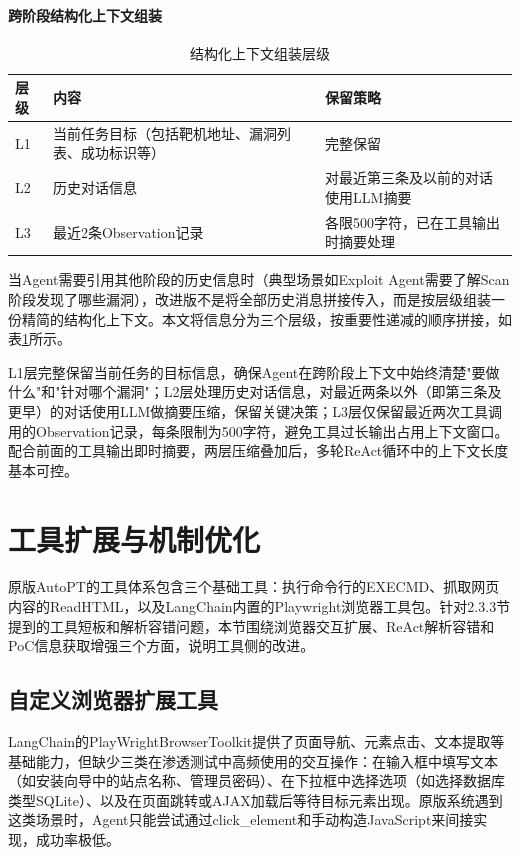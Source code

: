 \paragraph{跨阶段结构化上下文组装}

\begin{table}[htbp]
\centering
\caption{结构化上下文组装层级} \label{tab:ch3:2}
  \renewcommand{\arraystretch}{1.3}
\begin{tabular}{lll}
    \toprule
层级 & 内容 & 保留策略 \\
    \midrule
L1 & 当前任务目标（包括靶机地址、漏洞列表、成功标识等） & 完整保留 \\
    \midrule
L2 & 历史对话信息 & 对最近第三条及以前的对话使用LLM摘要 \\
    \midrule
L3 & 最近2条Observation记录 & 各限500字符，已在工具输出时摘要处理 \\
    \bottomrule
\end{tabular}
\end{table}

当Agent需要引用其他阶段的历史信息时（典型场景如Exploit Agent需要了解Scan阶段发现了哪些漏洞），改进版不是将全部历史消息拼接传入，而是按层级组装一份精简的结构化上下文。本文将信息分为三个层级，按重要性递减的顺序拼接，如表\ref{tab:ch3:2}所示。

L1层完整保留当前任务的目标信息，确保Agent在跨阶段上下文中始终清楚"要做什么"和"针对哪个漏洞"；L2层处理历史对话信息，对最近两条以外（即第三条及更早）的对话使用LLM做摘要压缩，保留关键决策；L3层仅保留最近两次工具调用的Observation记录，每条限制为500字符，避免工具过长输出占用上下文窗口。配合前面的工具输出即时摘要，两层压缩叠加后，多轮ReAct循环中的上下文长度基本可控。

\section{工具扩展与机制优化}

原版AutoPT的工具体系包含三个基础工具：执行命令行的EXECMD、抓取网页内容的ReadHTML，以及LangChain内置的Playwright浏览器工具包。针对2.3.3节提到的工具短板和解析容错问题，本节围绕浏览器交互扩展、ReAct解析容错和PoC信息获取增强三个方面，说明工具侧的改进。

\subsection{自定义浏览器扩展工具}

LangChain的PlayWrightBrowserToolkit提供了页面导航、元素点击、文本提取等基础能力，但缺少三类在渗透测试中高频使用的交互操作：在输入框中填写文本（如安装向导中的站点名称、管理员密码）、在下拉框中选择选项（如选择数据库类型SQLite）、以及在页面跳转或AJAX加载后等待目标元素出现。原版系统遇到这类场景时，Agent只能尝试通过click\_element和手动构造JavaScript来间接实现，成功率极低。

